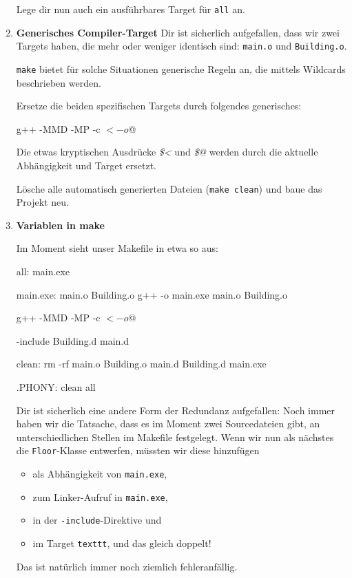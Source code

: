 \begin{enumerate}
Lege dir nun auch ein ausführbares Target für \texttt{all} an.





\item\textbf{Generisches Compiler-Target}
Dir ist sicherlich aufgefallen, dass wir zwei Targets haben, die mehr oder weniger identisch sind: \texttt{main.o} und \texttt{Building.o}.

\texttt{make} bietet für solche Situationen generische Regeln an, die mittels Wildcards beschrieben werden.

Ersetze die beiden spezifischen Targets durch folgendes generisches:
\begin{lstmake}
	g++ -MMD -MP -c $< -o $@
\end{lstmake}
Die etwas kryptischen Ausdrücke \emph{\$<} und \emph{\$@} werden durch die aktuelle Abhängigkeit und Target ersetzt.

Lösche alle automatisch generierten Dateien (\texttt{make clean}) und baue das Projekt neu.





\item\textbf{Variablen in make}

Im Moment sieht unser Makefile in etwa so aus:
\begin{lstmake}
all: main.exe

main.exe: main.o Building.o
	g++ -o main.exe main.o Building.o

	g++ -MMD -MP -c $< -o $@

-include Building.d main.d

clean:
	rm -rf main.o Building.o main.d Building.d main.exe
	
.PHONY: clean all
\end{lstmake}

Dir ist sicherlich eine andere Form der Redundanz aufgefallen:
Noch immer haben wir die Tatsache, dass es im Moment zwei Sourcedateien gibt, an unterschiedlichen Stellen im Makefile festgelegt.
Wenn wir nun als nächstes die \texttt{Floor}-Klasse entwerfen, müssten wir diese hinzufügen
\begin{itemize}
	\item als Abhängigkeit von \texttt{main.exe},
	\item zum Linker-Aufruf in \texttt{main.exe},
	\item in der \texttt{-include}-Direktive und
	\item im Target \texttt{texttt}, und das gleich doppelt!
\end{itemize}
Das ist natürlich immer noch ziemlich fehleranfällig.


\end{enumerate}
